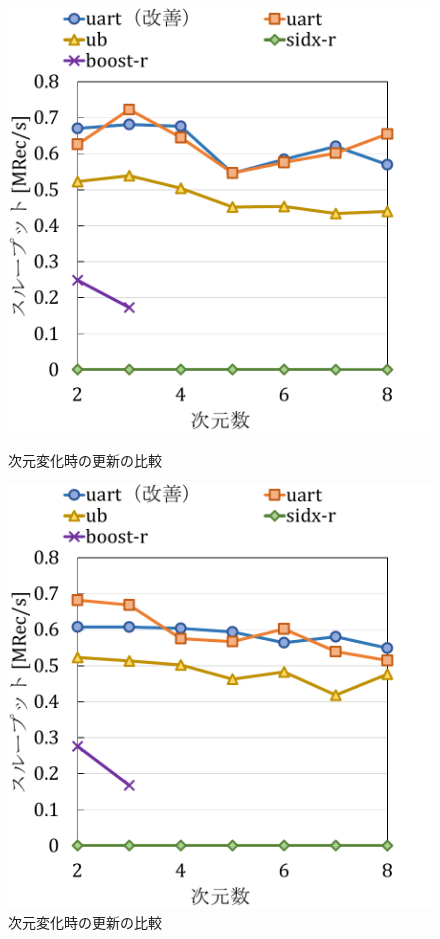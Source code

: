 \begin{figure}[tb]
  \begin{minipage}[c]{0.495\textwidth}
    \centering
    \includegraphics[scale=0.5]{./figures/graph-dimention-update-0.pdf}
    \caption{次元変化時の更新の比較}
    \label{graph:grouped}
  \end{minipage}
  \begin{minipage}[c]{0.495\textwidth}
    \centering
    \includegraphics[scale=0.5]{./figures/graph-dimention-update-0.5.pdf}
    \caption{次元変化時の更新の比較}
    \label{graph:paired}
  \end{minipage}
\end{figure}

